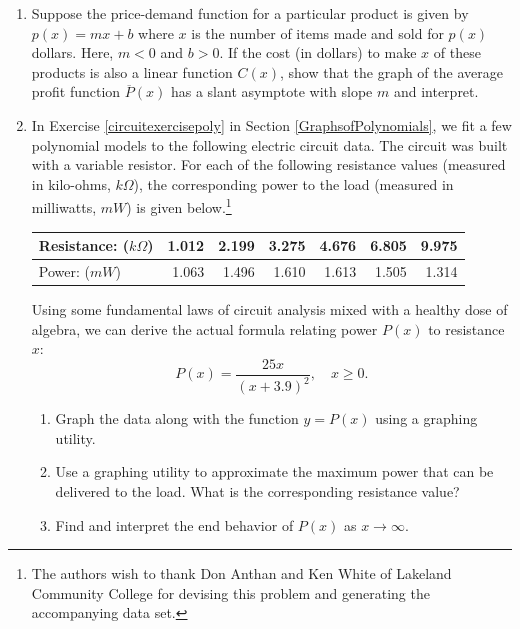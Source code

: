 \begin{enumerate}
\item  \label{slantyintaverageprofitexercise} Suppose the price-demand function for a particular product is given by $p(x) = mx + b$  where $x$ is the number of items made and sold for $p(x)$ dollars.  Here,  $m<0$ and $b>0$.  If the cost (in dollars) to make $x$ of these products is also a linear  function $C(x)$, show that the graph of the average profit function $\overline{P}(x)$ has a slant asymptote with slope $m$ and interpret.

\item In Exercise \ref{circuitexercisepoly} in Section \ref{GraphsofPolynomials}, we fit a few polynomial models to the following electric circuit data. The circuit was built with a variable resistor.  For each of the following resistance values (measured in kilo-ohms, $k \Omega$),  the corresponding power to the load (measured in milliwatts, $mW$) is given below.\footnote{The authors wish to thank Don Anthan and Ken White of Lakeland Community College for devising this problem and generating the accompanying data set.}


\smallskip

\noindent \begin{tabular}{|l|r|r|r|r|r|r|} \hline
Resistance: ($k \Omega$) & 1.012 & 2.199 & 3.275 & 4.676 & 6.805 & 9.975 \\ \hline
Power: ($mW$) & 1.063 & 1.496 & 1.610 & 1.613 & 1.505 & 1.314 \\ \hline
\end{tabular}

\smallskip

\noindent Using some fundamental laws of circuit analysis mixed with a healthy dose of algebra, we can derive the actual formula relating power $P(x)$ to resistance $x$:   \[P(x) = \frac{25x}{(x + 3.9)^2}, \quad x \geq 0.\]

\begin{enumerate}

\item Graph the data along with the function $y = P(x)$ using a graphing utility.

\item Use a graphing utility to approximate the maximum power that can be delivered to the load.  What is the corresponding resistance value?

\item Find and interpret the end behavior of $P(x)$ as $x \rightarrow \infty$.

\end{enumerate}



\end{enumerate}
